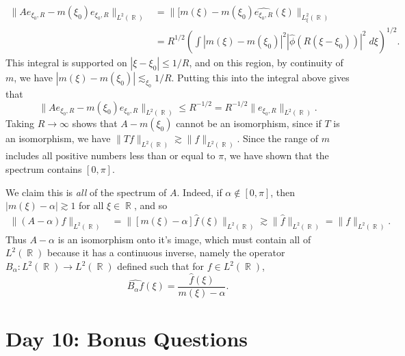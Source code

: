 \documentclass[answers]{exam}
\DeclareMathOperator{\RR}{\mathbb{R}}
\theoremstyle{problemstyle}
\newcommand{\1}[1]{\textbf{1}_{\left[#1\right]}} %
\begin{document}
\begin{questions}
\begin{solution}
	\begin{align*}
		\| Ae_{\xi_0,R} - m(\xi_0) e_{\xi_0,R} \|_{L^2(\RR)} &= \| [m(\xi) - m(\xi_0) \widehat{e_{\xi_0,R}}(\xi) \|_{L^2_\xi(\RR)}\\
		&= R^{1/2} \left( \int |m(\xi) - m(\xi_0)|^2 |\widehat{\phi}(R (\xi - \xi_0))|^2\; d\xi \right)^{1/2}.
	\end{align*}
	This integral is supported on $|\xi - \xi_0| \leq 1/R$, and on this region, by continuity of $m$, we have $|m(\xi) - m(\xi_0)| \lesssim_{\xi_0} 1/R$. Putting this into the integral above gives that
	\[ \| Ae_{\xi_0,R} - m(\xi_0) e_{\xi_0,R} \|_{L^2(\RR)} \leq R^{-1/2} = R^{-1/2} \| e_{\xi_0,R} \|_{L^2(\RR)}. \]
	Taking $R \to \infty$ shows that $A - m(\xi_0)$ cannot be an isomorphism, since if $T$ is an isomorphism, we have $\| Tf \|_{L^2(\RR)} \gtrsim \| f \|_{L^2(\RR)}$. Since the range of $m$ includes all positive numbers less than or equal to $\pi$, we have shown that the spectrum contains $[0,\pi]$.

	We claim this is \emph{all} of the spectrum of $A$. Indeed, if $\alpha \not \in [0,\pi]$, then $|m(\xi) - \alpha| \gtrsim 1$ for all $\xi \in \RR$, and so
	\begin{align*}
		\| (A - \alpha) f \|_{L^2(\RR)} &= \| [m(\xi) - \alpha] \widehat{f}(\xi) \|_{L^2(\RR)} \gtrsim \| \widehat{f} \|_{L^2(\RR)} = \| f \|_{L^2(\RR)}.
	\end{align*}
	Thus $A - \alpha$ is an isomorphism onto it's image, which must contain all of $L^2(\RR)$ because it has a continuous inverse, namely the operator $B_\alpha: L^2(\RR) \to L^2(\RR)$ defined such that for $f \in L^2(\RR)$,
	\[ \widehat{B_\alpha f}(\xi) = \frac{\widehat{f}(\xi)}{m(\xi) - \alpha}. \]
\end{solution}

\newpage
\section{Day 10: Bonus Questions}


\end{questions}
\end{document}
